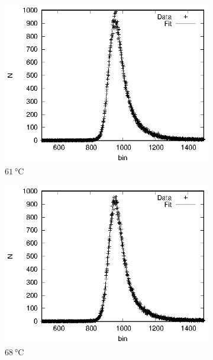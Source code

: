 \begin{figure}[h]
\begin{subfigure}[h]{0.49\textwidth}
    \includegraphics[width=\textwidth]{evaluation_kilian/temp/na_61.eps}
    \caption{$\SI{61}{\celsius}$}
  \end{subfigure}
  \begin{subfigure}[h]{0.49\textwidth}
    \centering
    \includegraphics[width=\textwidth]{evaluation_kilian/temp/na_68.eps}
    \caption{$\SI{68}{\celsius}$}
  \end{subfigure}
  \begin{subfigure}[h]{0.49\textwidth}
    \centering

\end{subfigure}
\end{figure}
